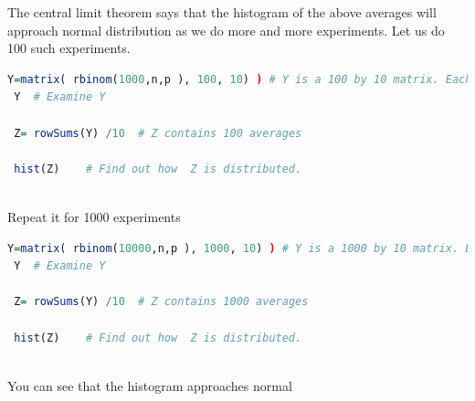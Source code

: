 \documentclass["../Applied_probabillity _and_statistics_lab_KTU.tex"]{subfiles}
\begin{document}
The  central limit theorem says that the histogram  of the above averages will approach normal distribution as we do more and more experiments.
 Let us do 100 such experiments.
 
 
 \begin{lstlisting}[language=R]
 Y=matrix( rbinom(1000,n,p ), 100, 10) ) # Y is a 100 by 10 matrix. Each row contains 10 numbers sampled from the binomial distribution.
 Y  # Examine Y

 Z= rowSums(Y) /10  # Z contains 100 averages  

 hist(Z)    # Find out how  Z is distributed.
 
\end{lstlisting}
 
 Repeat it for  1000 experiments 
 
 
 \begin{lstlisting}[language=R]
 Y=matrix( rbinom(10000,n,p ), 1000, 10) ) # Y is a 1000 by 10 matrix. Each row contains 10 numbers sampled from the binomial distribution.
 Y  # Examine Y

 Z= rowSums(Y) /10  # Z contains 1000 averages  

 hist(Z)    # Find out how  Z is distributed.
 
\end{lstlisting}

You can see that the histogram approaches normal
\end{document}
